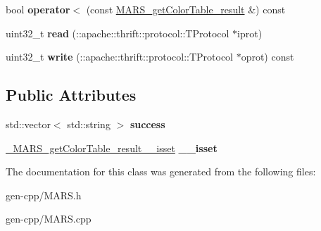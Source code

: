 \begin{DoxyCompactItemize}
\item 
\mbox{\label{classMARS_1_1MARS__getColorTable__result_adcc9196065c8028b7cb792698a44735b}} 
bool {\bfseries operator$<$} (const \hyperlink{classMARS_1_1MARS__getColorTable__result}{M\+A\+R\+S\+\_\+get\+Color\+Table\+\_\+result} \&) const
\item 
\mbox{\label{classMARS_1_1MARS__getColorTable__result_a6a6d7f7aabc39052bbbe00b75a06fe3b}} 
uint32\+\_\+t {\bfseries read} (\+::apache\+::thrift\+::protocol\+::\+T\+Protocol $\ast$iprot)
\item 
\mbox{\label{classMARS_1_1MARS__getColorTable__result_ae897d516d900713921c510d23a4a4dee}} 
uint32\+\_\+t {\bfseries write} (\+::apache\+::thrift\+::protocol\+::\+T\+Protocol $\ast$oprot) const
\end{DoxyCompactItemize}
\subsection*{Public Attributes}
\begin{DoxyCompactItemize}
\item 
\mbox{\label{classMARS_1_1MARS__getColorTable__result_ad451b498aecd8356d94853586cdb1bf8}} 
std\+::vector$<$ std\+::string $>$ {\bfseries success}
\item 
\mbox{\label{classMARS_1_1MARS__getColorTable__result_a5969aa2f5c72ddaf03bba6bc2359905d}} 
\hyperlink{structMARS_1_1__MARS__getColorTable__result____isset}{\+\_\+\+M\+A\+R\+S\+\_\+get\+Color\+Table\+\_\+result\+\_\+\+\_\+isset} {\bfseries \+\_\+\+\_\+isset}
\end{DoxyCompactItemize}


The documentation for this class was generated from the following files\+:\begin{DoxyCompactItemize}
\item 
gen-\/cpp/M\+A\+R\+S.\+h\item 
gen-\/cpp/M\+A\+R\+S.\+cpp\end{DoxyCompactItemize}
